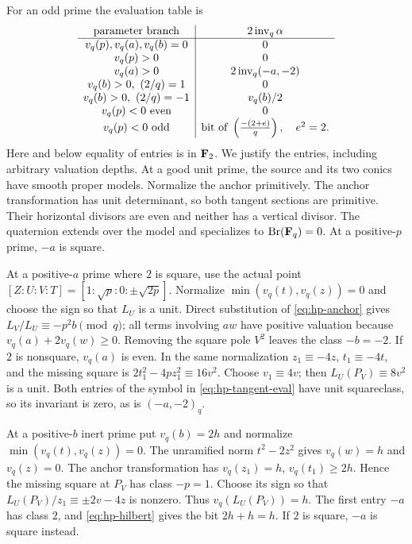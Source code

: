 For an odd prime the evaluation table is
\begin{equation}\label{eq:hp-odd-table}
\begin{array}{c|c}
 \text{parameter branch}&2\operatorname{inv}_q\alpha\\ \hline
 v_q(p),v_q(a),v_q(b)=0&0\\
 v_q(p)>0&0\\
 v_q(a)>0&2\operatorname{inv}_q(-a,-2)\\
 v_q(b)>0,\ (2/q)=1&0\\
 v_q(b)>0,\ (2/q)=-1&v_q(b)/2\\
 v_q(p)<0\text{ even}&0\\
 v_q(p)<0\text{ odd}&\text{bit of }\left(\frac{-(2+e)}{q}\right),\quad e^2=2.
\end{array}
\end{equation}
Here and below equality of entries is in $\mathbf F_2$.
We justify the entries, including arbitrary valuation depths.
At a good unit prime, the source and its two conics have smooth proper
models.  Normalize the anchor primitively.  The anchor transformation
has unit determinant, so both tangent sections are primitive.  Their
horizontal divisors are even and neither has a vertical divisor.
The quaternion extends over the model and specializes to
$\operatorname{Br}(\mathbf F_q)=0$.  At a positive-$p$ prime, $-a$ is square.

At a positive-$a$ prime where $2$ is square, use the actual point
$[Z:U:V:T]=[1:\sqrt p:0:\pm\sqrt{2p}]$.
Normalize $\min(v_q(t),v_q(z))=0$ and choose the sign so that $L_U$
is a unit.  Direct substitution of \eqref{eq:hp-anchor} gives
$L_V/L_U\equiv-p^2b\pmod q$; all terms involving $aw$ have positive
valuation because $v_q(a)+2v_q(w)\ge0$.
Removing the square pole $V^2$ leaves the class $-b=-2$.
If $2$ is nonsquare, $v_q(a)$ is even.  In the same normalization
$z_1\equiv-4z$, $t_1\equiv-4t$, and the missing square is
$2t_1^2-4pz_1^2\equiv16v^2$.
Choose $v_1\equiv4v$; then $L_U(P_V)\equiv8v^2$ is a unit.
Both entries of the symbol in \eqref{eq:hp-tangent-eval} have unit
squareclass, so its invariant is zero, as is $(-a,-2)_q$.

At a positive-$b$ inert prime put $v_q(b)=2h$ and normalize
$\min(v_q(t),v_q(z))=0$.  The unramified norm $t^2-2z^2$ gives
$v_q(w)=h$ and $v_q(z)=0$.  The anchor transformation has
$v_q(z_1)=h$, $v_q(t_1)\ge2h$.  Hence the missing square at $P_V$
has class $-p=1$.  Choose its sign so that
$L_U(P_V)/z_1\equiv\pm2v-4z$ is nonzero.
Thus $v_q(L_U(P_V))=h$.  The first entry $-a$ has class $2$, and
\eqref{eq:hp-hilbert} gives the bit $2h+h=h$.
If $2$ is square, $-a$ is square instead.

